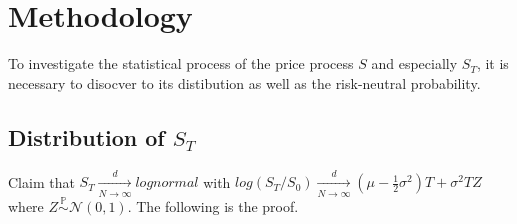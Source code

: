 \documentclass[12pt]{article}
\begin{document}
\section{Methodology}
To investigate the statistical process of the price process $S$ and especially $S_T$, it is necessary to disocver to its distibution as well as the risk-neutral probability. 

\subsection{Distribution of $S_T$}
Claim that $S_T \xrightarrow[N \rightarrow \infty]{d} lognormal$ with $log(S_T/S_0) \xrightarrow[N \rightarrow \infty]{d} (\mu - \frac{1}{2}\sigma^2)T + \sigma^2 TZ$ 
where $Z \stackrel{\mathbb{P}}{\sim} \mathcal{N}(0, 1)$. The following is the proof.\\
\end{document}
